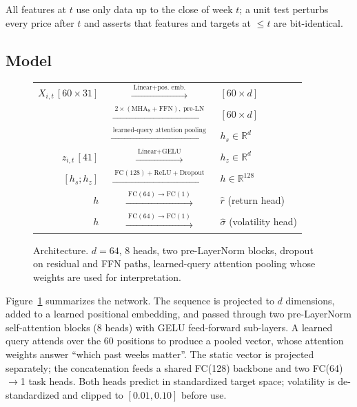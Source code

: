 \documentclass[conference]{IEEEtran}
\begin{document}
All features at $t$ use only data up to the close of week $t$; a unit test perturbs every price after $t$ and asserts that features and targets at $\le t$ are bit-identical.

\subsection{Model}
\begin{figure}[t]\centering\scriptsize
\begin{tabular}{@{}rcl@{}}
$X_{i,t}\,[60{\times}31]$ & $\xrightarrow{\;\text{Linear}+\text{pos.\ emb.}\;}$ & $[60{\times}d]$ \\
 & $\xrightarrow{\;2\times(\text{MHA}_{8}+\text{FFN}),\ \text{pre-LN}\;}$ & $[60{\times}d]$ \\
 & $\xrightarrow{\;\text{learned-query attention pooling}\;}$ & $h_s\in\mathbb{R}^{d}$ \\[2pt]
$z_{i,t}\,[41]$ & $\xrightarrow{\;\text{Linear}+\text{GELU}\;}$ & $h_z\in\mathbb{R}^{d}$ \\[2pt]
$[h_s;h_z]$ & $\xrightarrow{\;\text{FC}(128)+\text{ReLU}+\text{Dropout}\;}$ & $h\in\mathbb{R}^{128}$ \\
$h$ & $\xrightarrow{\;\text{FC}(64)\to\text{FC}(1)\;}$ & $\hat r$ \quad (return head) \\
$h$ & $\xrightarrow{\;\text{FC}(64)\to\text{FC}(1)\;}$ & $\hat\sigma$ \quad (volatility head)
\end{tabular}
\caption{Architecture. $d=64$, 8 heads, two pre-LayerNorm blocks, dropout \bestdropout{} on residual and FFN paths, learned-query attention pooling whose weights are used for interpretation.}
\label{fig:arch}
\end{figure}
Figure~\ref{fig:arch} summarizes the network. The sequence is projected to $d$ dimensions, added to a learned positional embedding, and passed through two pre-LayerNorm self-attention blocks (8 heads) with GELU feed-forward sub-layers. A learned query attends over the 60 positions to produce a pooled vector, whose attention weights answer ``which past weeks matter''. The static vector is projected separately; the concatenation feeds a shared FC(128) backbone and two FC(64)$\to$1 task heads. Both heads predict in standardized target space; volatility is de-standardized and clipped to $[0.01,0.10]$ before use.
\end{document}
